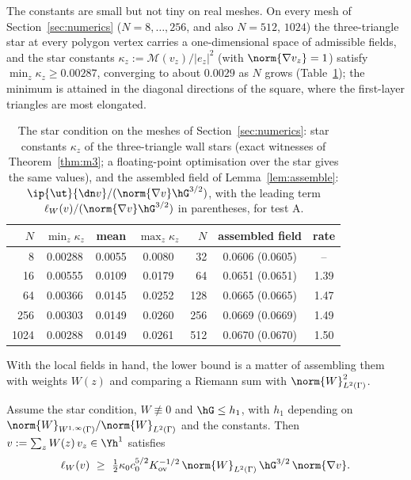 The constants are small but not tiny on real meshes. On every mesh of Section~\ref{sec:numerics} ($N=8,\dots,256$, and also $N=512$, $1024$) the three-triangle star at every polygon vertex carries a one-dimensional space of admissible fields, and the star constants $\kappa_z:=\mathcal M(v_z)/|e_z|^2$ (with $\norm{\nabla v_z}=1$) satisfy $\min_z\kappa_z\ge0.00287$, converging to about $0.0029$ as $N$ grows (Table~\ref{tab:stars}); the minimum is attained in the diagonal directions of the square, where the first-layer triangles are most elongated.

\begin{table}[t]
\centering\small
\caption{The star condition on the meshes of Section~\ref{sec:numerics}: star constants $\kappa_z$ of the three-triangle wall stars (exact witnesses of Theorem~\ref{thm:m3}; a floating-point optimisation over the star gives the same values), and the assembled field of Lemma~\ref{lem:assemble}: $\ip{\ut}{\dn v}/(\norm{\nabla v}\hG^{3/2})$, with the leading term $\ell_W(v)/(\norm{\nabla v}\hG^{3/2})$ in parentheses, for test A.}\label{tab:stars}
\begin{tabular}{rccc|rcc}
\toprule
$N$ & $\min_z\kappa_z$ & mean & $\max_z\kappa_z$ & $N$ & assembled field & rate\\
\midrule
8 & 0.00288 & 0.0055 & 0.0080 & 32 & 0.0606 (0.0605) & --\\
16 & 0.00555 & 0.0109 & 0.0179 & 64 & 0.0651 (0.0651) & 1.39\\
64 & 0.00366 & 0.0145 & 0.0252 & 128 & 0.0665 (0.0665) & 1.47\\
256 & 0.00303 & 0.0149 & 0.0260 & 256 & 0.0669 (0.0669) & 1.49\\
1024 & 0.00288 & 0.0149 & 0.0261 & 512 & 0.0670 (0.0670) & 1.50\\
\bottomrule
\end{tabular}
\end{table}

With the local fields in hand, the lower bound is a matter of assembling them with weights $W(z)$ and comparing a Riemann sum with $\norm{W}^2_{L^2(\Gamma)}$.

\begin{lemma}[Assembly]\label{lem:assemble}
Assume the star condition, $W\not\equiv0$ and $\hG\le h_1$, with $h_1$ depending on $\norm{W}_{W^{1,\infty}(\Gamma)}/\norm{W}_{L^2(\Gamma)}$ and the constants. Then $v:=\sum_zW(z)\,v_z\in\Yh^1$ satisfies
\[
\ell_W(v)\ \ge\ \tfrac12\kappa_0c_0^{5/2}K_{\mathrm{ov}}^{-1/2}\,\norm{W}_{L^2(\Gamma)}\,\hG^{3/2}\,\norm{\nabla v}.
\]
\end{lemma}

